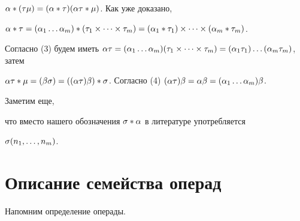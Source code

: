 \begin{pf}
$\alpha*(\tau\mu)=(\alpha * \tau)(\alpha\tau*\mu)$. Как уже доказано,


$\al*\t=(\al_1\dotsc \al_m)*(\t_1\times\dotsb\times\t_m)


=(\al_1*\t_1)\times\dotsb\times (\al_m*\t_m)$.


Согласно (3) будем иметь $\al\t=(\al_1\dotsc \al_m)


(\t_1\times\dotsb\times\t_m)=(\al_1\t_1)\dotsc (\al_m\t_m)$, затем


$\al\t*\mu=(\be\s)=((\al\t)\be)*\s$. Согласно (4) $(\al\t)\be=\al\be=


(\al_1\dotsc \al_m)\be$.


\end{pf}








Заметим еще,


что вместо нашего обозначения $\sigma * \alpha $ в литературе употребляется


$\sigma(n_1,\dotsc,n_m)$.








\section{Описание семейства операд}





Напомним определение операды.





